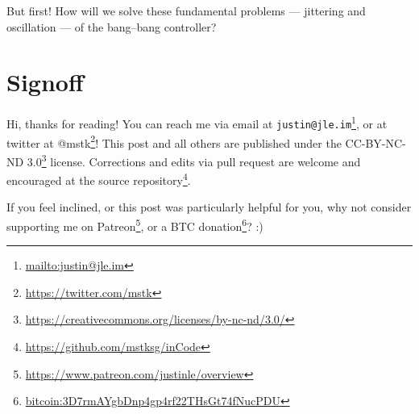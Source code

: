 \documentclass[]{article}
\renewcommand{\href}[2]{#2\footnote{\url{#1}}}
\begin{document}
But first! How will we solve these fundamental problems --- jittering and
oscillation --- of the bang--bang controller?

\section{Signoff}\label{signoff}

Hi, thanks for reading! You can reach me via email at
\href{mailto:justin@jle.im}{\nolinkurl{justin@jle.im}}, or at twitter at
\href{https://twitter.com/mstk}{@mstk}! This post and all others are published
under the \href{https://creativecommons.org/licenses/by-nc-nd/3.0/}{CC-BY-NC-ND
3.0} license. Corrections and edits via pull request are welcome and encouraged
at \href{https://github.com/mstksg/inCode}{the source repository}.

If you feel inclined, or this post was particularly helpful for you, why not
consider \href{https://www.patreon.com/justinle/overview}{supporting me on
Patreon}, or a \href{bitcoin:3D7rmAYgbDnp4gp4rf22THsGt74fNucPDU}{BTC donation}?
:)
\end{document}
